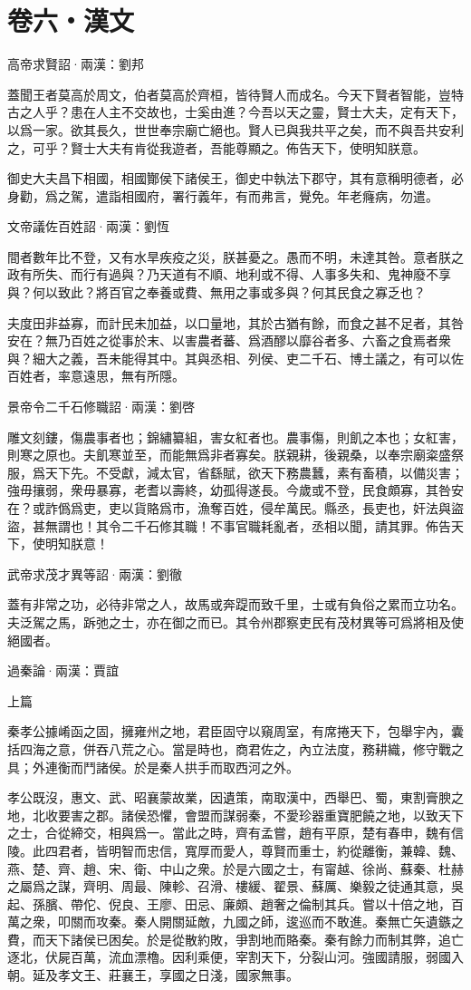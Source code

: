 \documentclass[12pt,a4paper]{ctexbook}
\begin{document}
\section{卷六・漢文}
高帝求賢詔·兩漢：劉邦 \par
蓋聞王者莫高於周文，伯者莫高於齊桓，皆待賢人而成名。今天下賢者智能，豈特古之人乎？患在人主不交故也，士奚由進？今吾以天之靈，賢士大夫，定有天下，以爲一家。欲其長久，世世奉宗廟亡絕也。賢人已與我共平之矣，而不與吾共安利之，可乎？賢士大夫有肯從我遊者，吾能尊顯之。佈告天下，使明知朕意。\par
御史大夫昌下相國，相國酇侯下諸侯王，御史中執法下郡守，其有意稱明德者，必身勸，爲之駕，遣詣相國府，署行義年，有而弗言，覺免。年老癃病，勿遣。\par
文帝議佐百姓詔·兩漢：劉恆 \par
間者數年比不登，又有水旱疾疫之災，朕甚憂之。愚而不明，未達其咎。意者朕之政有所失、而行有過與？乃天道有不順、地利或不得、人事多失和、鬼神廢不享與？何以致此？將百官之奉養或費、無用之事或多與？何其民食之寡乏也？\par
夫度田非益寡，而計民未加益，以口量地，其於古猶有餘，而食之甚不足者，其咎安在？無乃百姓之從事於末、以害農者蕃、爲酒醪以靡谷者多、六畜之食焉者衆與？細大之義，吾未能得其中。其與丞相、列侯、吏二千石、博土議之，有可以佐百姓者，率意遠思，無有所隱。\par
景帝令二千石修職詔·兩漢：劉啓 \par
雕文刻鏤，傷農事者也；錦繡纂組，害女紅者也。農事傷，則飢之本也；女紅害，則寒之原也。夫飢寒並至，而能無爲非者寡矣。朕親耕，後親桑，以奉宗廟粢盛祭服，爲天下先。不受獻，減太官，省繇賦，欲天下務農蠶，素有畜積，以備災害；強毋攘弱，衆毋暴寡，老耆以壽終，幼孤得遂長。今歲或不登，民食頗寡，其咎安在？或詐僞爲吏，吏以貨賂爲市，漁奪百姓，侵牟萬民。縣丞，長吏也，奸法與盜盜，甚無謂也！其令二千石修其職！不事官職耗亂者，丞相以聞，請其罪。佈告天下，使明知朕意！\par
武帝求茂才異等詔·兩漢：劉徹 \par
蓋有非常之功，必待非常之人，故馬或奔踶而致千里，士或有負俗之累而立功名。夫泛駕之馬，跅弛之士，亦在御之而已。其令州郡察吏民有茂材異等可爲將相及使絕國者。\par
過秦論·兩漢：賈誼 \par
上篇\par
秦孝公據崤函之固，擁雍州之地，君臣固守以窺周室，有席捲天下，包舉宇內，囊括四海之意，併吞八荒之心。當是時也，商君佐之，內立法度，務耕織，修守戰之具；外連衡而鬥諸侯。於是秦人拱手而取西河之外。\par
孝公既沒，惠文、武、昭襄蒙故業，因遺策，南取漢中，西舉巴、蜀，東割膏腴之地，北收要害之郡。諸侯恐懼，會盟而謀弱秦，不愛珍器重寶肥饒之地，以致天下之士，合從締交，相與爲一。當此之時，齊有孟嘗，趙有平原，楚有春申，魏有信陵。此四君者，皆明智而忠信，寬厚而愛人，尊賢而重士，約從離衡，兼韓、魏、燕、楚、齊、趙、宋、衛、中山之衆。於是六國之士，有甯越、徐尚、蘇秦、杜赫之屬爲之謀，齊明、周最、陳軫、召滑、樓緩、翟景、蘇厲、樂毅之徒通其意，吳起、孫臏、帶佗、倪良、王廖、田忌、廉頗、趙奢之倫制其兵。嘗以十倍之地，百萬之衆，叩關而攻秦。秦人開關延敵，九國之師，逡巡而不敢進。秦無亡矢遺鏃之費，而天下諸侯已困矣。於是從散約敗，爭割地而賂秦。秦有餘力而制其弊，追亡逐北，伏屍百萬，流血漂櫓。因利乘便，宰割天下，分裂山河。強國請服，弱國入朝。延及孝文王、莊襄王，享國之日淺，國家無事。\par
\end{document}
